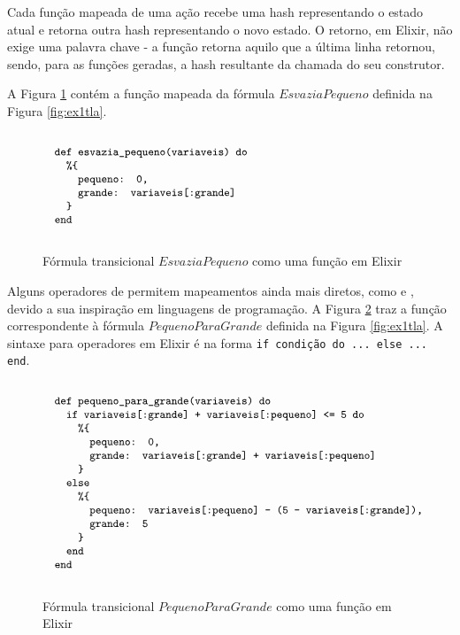 Cada função mapeada de uma ação recebe uma hash representando o estado atual e retorna outra hash representando o novo estado. O retorno, em Elixir, não exige uma palavra chave - a função retorna aquilo que a última linha retornou, sendo, para as funções geradas, a hash resultante da chamada do seu construtor.

A Figura \ref{fig:esvaziapequeno-elixir} contém a função mapeada da fórmula $EsvaziaPequeno$ definida na Figura \ref{fig:ex1tla}.

\begin{figure}[h]
  \centering
  $\progfig{
  ~~def esvazia\_pequeno(variaveis) do\\
  ~~~~\%\{\\
  ~~~~~~pequeno: 0,\\
  ~~~~~~grande: variaveis[:grande]\\
  ~~~~\}\\
  ~~end
  }$
  \caption{Fórmula transicional $EsvaziaPequeno$ como uma função em Elixir}
\label{fig:esvaziapequeno-elixir}
\end{figure}

Alguns operadores de \TLA permitem mapeamentos ainda mais diretos, como \IF e \CASE, devido a sua inspiração em linguagens de programação. A Figura \ref{fig:pequenoparagrande-elixir} traz a função correspondente à fórmula $PequenoParaGrande$ definida na Figura \ref{fig:ex1tla}. A sintaxe para operadores \IF em Elixir é na forma \texttt{if condição do ... else ... end}.

\begin{figure}[h]
  \centering
  $\progfig{
  ~~def pequeno\_para\_grande(variaveis) do\\
  ~~~~if variaveis[:grande] + variaveis[:pequeno] <= 5 do\\
  ~~~~~~\%\{\\
  ~~~~~~~~pequeno: 0,\\
  ~~~~~~~~grande: variaveis[:grande] + variaveis[:pequeno]\\
  ~~~~~~\}\\
  ~~~~else\\
  ~~~~~~\%\{\\
  ~~~~~~~~pequeno: variaveis[:pequeno] - (5 - variaveis[:grande]),\\
  ~~~~~~~~grande: 5\\
  ~~~~~~\}\\
  ~~~~end\\
  ~~end
  }$
  \caption{Fórmula transicional $PequenoParaGrande$ como uma função em Elixir}
\label{fig:pequenoparagrande-elixir}
\end{figure}

